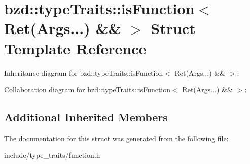 \hypertarget{structbzd_1_1typeTraits_1_1isFunction_3_01Ret_07Args_8_8_8_08_01_6_6_01_4}{}\section{bzd\+:\+:type\+Traits\+:\+:is\+Function$<$ Ret(Args...) \&\& $>$ Struct Template Reference}
\label{structbzd_1_1typeTraits_1_1isFunction_3_01Ret_07Args_8_8_8_08_01_6_6_01_4}


Inheritance diagram for bzd\+:\+:type\+Traits\+:\+:is\+Function$<$ Ret(Args...) \&\& $>$\+:


Collaboration diagram for bzd\+:\+:type\+Traits\+:\+:is\+Function$<$ Ret(Args...) \&\& $>$\+:
\subsection*{Additional Inherited Members}


The documentation for this struct was generated from the following file\+:\begin{DoxyCompactItemize}
\item 
include/type\+\_\+traits/function.\+h\end{DoxyCompactItemize}
